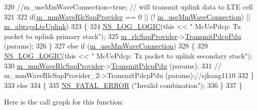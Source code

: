 \begin{DoxyCode}
320          \textcolor{comment}{//m\_useMmWaveConnection=true;  // will transmit uplink data to LTE cell}
321 
322           \textcolor{keywordflow}{if}(\hyperlink{classns3_1_1McUePdcp_a8575b586e150b7993bbd20a6dfc99bdd}{m\_mmWaveRlcSapProvider} == 0 || (!
      \hyperlink{classns3_1_1McUePdcp_ae995f7a56173ed7e2ba8f215c928e5a4}{m\_useMmWaveConnection}) || \hyperlink{classns3_1_1McUePdcp_add1fd75af318fec889e06a47f4407be7}{m\_alwaysLteUplink})
323           \{
324             \hyperlink{group__logging_ga88acd260151caf2db9c0fc84997f45ce}{NS\_LOG\_LOGIC}(\textcolor{keyword}{this} << \textcolor{stringliteral}{" McUePdcp: Tx packet to uplink primary stack"});
325             \hyperlink{classns3_1_1McUePdcp_aa86e9bf17a9f0ae8f66f884f06e63348}{m\_rlcSapProvider}->\hyperlink{classns3_1_1LteRlcSapProvider_ad2bdc756a034aa21c163da2deb705a50}{TransmitPdcpPdu} (params);
326           \}
327           \textcolor{keywordflow}{else} \textcolor{keywordflow}{if} (\hyperlink{classns3_1_1McUePdcp_ae995f7a56173ed7e2ba8f215c928e5a4}{m\_useMmWaveConnection})
328           \{
329             \hyperlink{group__logging_ga88acd260151caf2db9c0fc84997f45ce}{NS\_LOG\_LOGIC}(\textcolor{keyword}{this} << \textcolor{stringliteral}{" McUePdcp: Tx packet to uplink secondary stack"});
330             \hyperlink{classns3_1_1McUePdcp_a8575b586e150b7993bbd20a6dfc99bdd}{m\_mmWaveRlcSapProvider}->\hyperlink{classns3_1_1LteRlcSapProvider_ad2bdc756a034aa21c163da2deb705a50}{TransmitPdcpPdu} (params);
331            \textcolor{comment}{// m\_mmWaveRlcSapProvider\_2->TransmitPdcpPdu (params);//sjkang1110}
332           \}
333           \textcolor{keywordflow}{else}
334           \{
335             \hyperlink{group__fatal_ga5131d5e3f75d7d4cbfd706ac456fdc85}{NS\_FATAL\_ERROR} (\textcolor{stringliteral}{"Invalid combination"});
336           \}
337 \}
\end{DoxyCode}


Here is the call graph for this function\+:


